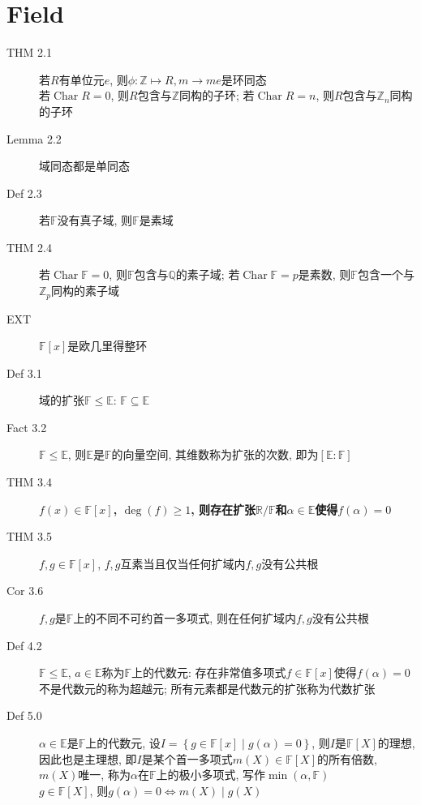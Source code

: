 \documentclass{article}
\renewcommand{\l}{\left}
\renewcommand{\r}{\right}
\renewcommand{\char}{\operatorname{Char}}
\begin{document}
    \section{Field}
    \begin{description}
        \item[THM 2.1] 若$R$有单位元$e$, 则$\phi: \mathbb Z \mapsto R, m \to me$是环同态\\
            若$\char R = 0$, 则$R$包含与$\mathbb Z$同构的子环; 若$\char R = n$, 则$R$包含与$\mathbb Z_n$同构的子环
        \item[Lemma 2.2] 域同态都是单同态
        \item[Def 2.3] 若$\mathbb F$没有真子域, 则$\mathbb F$是素域
        \item[THM 2.4] 若$\char \mathbb F = 0$, 则$\mathbb F$包含与$\mathbb Q$的素子域; 若$\char \mathbb F = p$是素数, 则$\mathbb F$包含一个与$\mathbb Z_p$同构的素子域
        \item[EXT] $\mathbb F[x]$是欧几里得整环
        \item[Def 3.1] 域的扩张$\mathbb F \le \mathbb E$: $\mathbb F \subseteq \mathbb E$
        \item[Fact 3.2] $\mathbb F \le \mathbb E$, 则$\mathbb E$是$\mathbb F$的向量空间, 其维数称为扩张的次数, 即为$[\mathbb E:\mathbb F]$
        \item[THM 3.4] \textbf{$f(x) \in \mathbb F[x]$, $\deg(f) \ge 1$, 则存在扩张$\mathbb R/\mathbb F$和$\alpha \in \mathbb E$使得$f(\alpha) = 0$}
        \item[THM 3.5] $f, g \in \mathbb F[x]$, $f, g$互素当且仅当任何扩域内$f, g$没有公共根
        \item[Cor 3.6] $f, g$是$\mathbb F$上的不同不可约首一多项式, 则在任何扩域内$f, g$没有公共根
        \item[Def 4.2] $\mathbb F \le \mathbb E$, $a \in \mathbb E$称为$\mathbb F$上的代数元: 存在非常值多项式$f \in \mathbb F[x]$使得$f(\alpha) = 0$\\
            不是代数元的称为超越元; 所有元素都是代数元的扩张称为代数扩张
        \item[Def 5.0] $\alpha \in \mathbb E$是$\mathbb F$上的代数元, 设$I = \l\{g \in \mathbb F[x] \mid g(\alpha) = 0 \r\}$,
            则$I$是$\mathbb F[X]$的理想, 因此也是主理想, 即$I$是某个首一多项式$m(X) \in \mathbb F[X]$的所有倍数,
            $m(X)$唯一, 称为$\alpha$在$\mathbb F$上的极小多项式, 写作$\min(\alpha, \mathbb F)$\\
            $g \in \mathbb F[X]$, 则$g(\alpha) = 0 \iff m(X) \mid g(X)$\\

\end{description}
\end{document}

